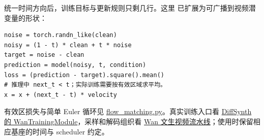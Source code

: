 统一时间方向后，训练目标与更新规则只剩几行。这里  已扩展为可广播到视频潜变量的形状：

\begin{verbatim}
noise = torch.randn_like(clean)
noisy = (1 - t) * clean + t * noise
target = noise - clean
prediction = model(noisy, t, condition)
loss = (prediction - target).square().mean()
# 推理中 next_t < t；实际训练需要按有效区域求平均。
x = x + (next_t - t) * velocity
\end{verbatim}

有效区损失与简单 Euler 循环见 \hyperref[code-flow-matching]{flow\_matching.py}。真实训练入口看 \href{https://github.com/modelscope/DiffSynth-Studio/blob/d32f72424cd22bc0ea8100cc57559149b4eac933/examples/wanvideo/model_training/train.py}{DiffSynth 的 WanTrainingModule}，采样和解码组织看 \href{https://github.com/Wan-Video/Wan2.1/blob/9737cba9c1c3c4d04b33fcad41c111989865d315/wan/text2video.py}{Wan 文生视频流水线}；使用时保留相应基座的时间与 scheduler 约定。

